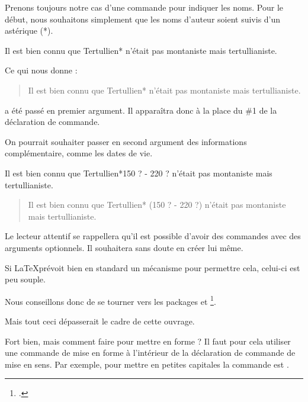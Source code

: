 Prenons toujours notre cas d'une commande pour indiquer les noms. Pour le début, nous souhaitons simplement que les noms d'auteur soient suivis d'un astérique (*).

\begin{latexcode}
\newcommand{\auteur}[1]{#1*}
Il est bien connu que \auteur{Tertullien} n'était pas montaniste
mais tertullianiste.
\end{latexcode}

\newcommand{\auteur}[1]{#1*}

Ce qui nous donne :

\begin{quotation}
Il est bien connu que \auteur{Tertullien} n'était pas montaniste mais tertullianiste.
\end{quotation}


 a été passé en premier argument. Il apparaîtra donc à la place du \#1 de la déclaration de commande.

On pourrait souhaiter passer en second argument des informations complémentaire, comme les dates de vie.

\begin{latexcode}
\newcommand{\auteur}[2]{#1* (#2)}
Il est bien connu que \auteur{Tertullien}{150 ? - 220 ?}
n'était pas montaniste mais tertullianiste.
\end{latexcode}

\renewcommand{\auteur}[2]{#1* (#2)}

\begin{quotation}
Il est bien connu que \auteur{Tertullien}{150 ? - 220 ?}
n'était pas montaniste mais tertullianiste.
\end{quotation}

\begin{plusloins}
Le lecteur attentif se rappellera  qu'il est possible d'avoir des commandes avec des arguments optionnels. Il souhaitera sans doute en créer lui même.

Si \LaTeX prévoit bien en standard un mécanisme pour permettre cela, celui-ci est  peu souple. 

Nous conseillons donc de se tourner vers les packages  et \footcites{xargs}{ifthen}.

Mais tout ceci dépasserait le cadre de cette ouvrage.
\end{plusloins}

Fort bien, mais comment faire pour mettre en forme ? Il faut pour cela utiliser une commande de mise en forme à l'intérieur de la déclaration de commande de mise en sens. Par exemple, pour mettre en petites capitales la commande est .

